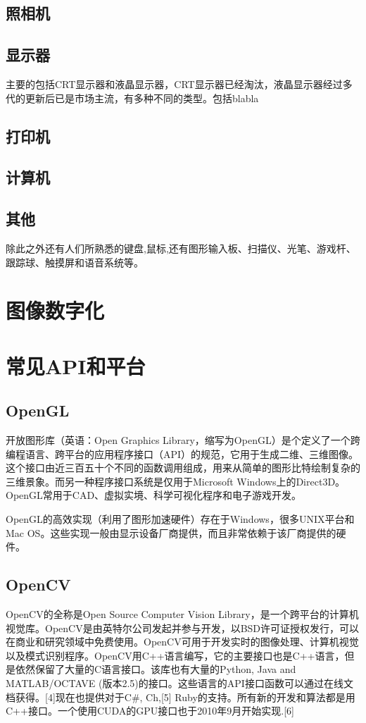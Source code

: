 \documentclass[UTF8]{article}
\begin{document}
\subsection{照相机}

\subsection{显示器}
主要的包括CRT显示器和液晶显示器，CRT显示器已经淘汰，液晶显示器经过多代的更新后已是市场主流，有多种不同的类型。包括blabla
\subsection{打印机}

\subsection{计算机}
\subsection{其他}
除此之外还有人们所熟悉的键盘,鼠标,还有图形输入板、扫描仪、光笔、游戏杆、跟踪球、触摸屏和语音系统等。

\section{图像数字化}




\section{常见API和平台}
\subsection{OpenGL}
开放图形库（英语：Open Graphics Library，缩写为OpenGL）是个定义了一个跨编程语言、跨平台的应用程序接口（API）的规范，它用于生成二维、三维图像。这个接口由近三百五十个不同的函数调用组成，用来从简单的图形比特绘制复杂的三维景象。而另一种程序接口系统是仅用于Microsoft Windows上的Direct3D。OpenGL常用于CAD、虚拟实境、科学可视化程序和电子游戏开发。

OpenGL的高效实现（利用了图形加速硬件）存在于Windows，很多UNIX平台和Mac OS。这些实现一般由显示设备厂商提供，而且非常依赖于该厂商提供的硬件。
\subsection{OpenCV}
OpenCV的全称是Open Source Computer Vision Library，是一个跨平台的计算机视觉库。OpenCV是由英特尔公司发起并参与开发，以BSD许可证授权发行，可以在商业和研究领域中免费使用。OpenCV可用于开发实时的图像处理、计算机视觉以及模式识别程序。OpenCV用C++语言编写，它的主要接口也是C++语言，但是依然保留了大量的C语言接口。该库也有大量的Python, Java and MATLAB/OCTAVE (版本2.5)的接口。这些语言的API接口函数可以通过在线文档获得。[4]现在也提供对于C#, Ch,[5] Ruby的支持。所有新的开发和算法都是用C++接口。一个使用CUDA的GPU接口也于2010年9月开始实现.[6]
\end{document}
